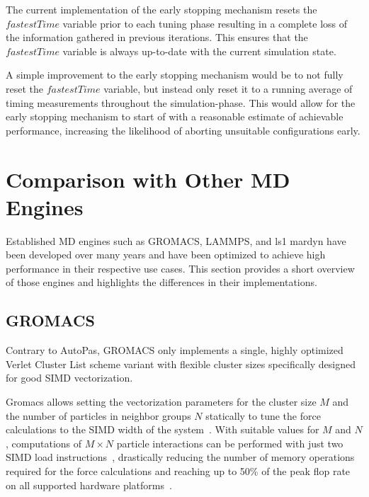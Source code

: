 \documentclass[conference]{IEEEtran}
\begin{document}
\begin{description}[leftmargin=1.2em, font=\itshape]
    \item[Limitations and Future Work:]
        The current implementation of the early stopping mechanism resets the $fastestTime$ variable prior to each tuning phase resulting in a complete loss of the information gathered in previous iterations. This ensures that the $fastestTime$ variable is always up-to-date with the current simulation state.

        A simple improvement to the early stopping mechanism would be to not fully reset the $fastestTime$ variable, but instead only reset it to a running average of timing measurements throughout the simulation-phase. This would allow for the early stopping mechanism to start of with a reasonable estimate of achievable performance, increasing the likelihood of aborting unsuitable configurations early.

\end{description}

\section{Comparison with Other MD Engines}

Established MD engines such as GROMACS, LAMMPS, and ls1 mardyn have been developed over many years and have been optimized to achieve high performance in their respective use cases. This section provides a short overview of those engines and highlights the differences in their implementations.

\subsection{GROMACS}

Contrary to AutoPas, GROMACS only implements a single, highly optimized Verlet Cluster List scheme variant with flexible cluster sizes specifically designed for good SIMD vectorization.

Gromacs allows setting the vectorization parameters for the cluster size $M$ and the number of particles in neighbor groups $N$ statically to tune the force calculations to the SIMD width of the system~\cite{PALL20132641}. With suitable values for $M$ and $N$, computations of $M \times N$ particle interactions can be performed with just two SIMD load instructions~\cite{Solving_Software_Challenges_Exascale_2014}, drastically reducing the number of memory operations required for the force calculations and reaching up to 50\% of the peak flop rate on all supported hardware platforms~\cite{Solving_Software_Challenges_Exascale_2014}.
\end{document}
